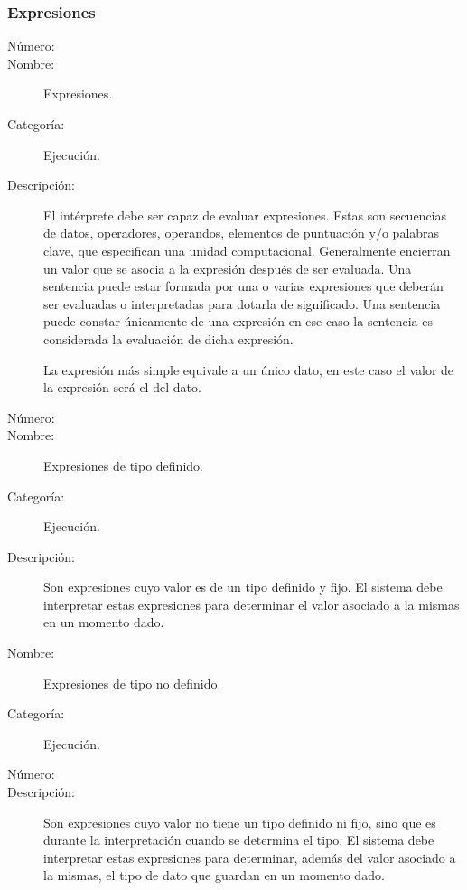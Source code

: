 \subsubsection{Expresiones}
\begin{framed}
	\begin{description}
		\item [Número:] \cn
		\item [Nombre:] Expresiones.
		\item [Categoría:] Ejecución.
		\item [Descripción:] El intérprete debe ser capaz de evaluar expresiones. Estas son secuencias de datos, operadores, operandos,
		elementos de puntuación y/o palabras clave, que especifican una unidad computacional.
		Generalmente encierran un valor que se asocia a la expresión después de ser evaluada. Una sentencia puede estar formada por una o
		varias expresiones que deberán ser evaluadas o interpretadas para dotarla de significado. Una sentencia puede constar únicamente
		de una expresión en ese caso la sentencia es considerada la evaluación de dicha expresión.
		
		La expresión más simple equivale a un único dato, en este caso el valor de la expresión será el del dato.
	\end {description}
\end{framed}

\begin{framed}
	\begin{description}
		\item [Número:] \cn
		\item [Nombre:] Expresiones de tipo definido.
		\item [Categoría:] Ejecución.
		\item [Descripción:] Son expresiones cuyo valor es de un tipo definido y fijo. El sistema debe interpretar estas expresiones para determinar el valor
		asociado a la mismas en un momento dado.
	\end {description}
\end{framed}

\begin{framed}
	\begin{description}
		\item [Nombre:] Expresiones de tipo no definido.
		\item [Categoría:] Ejecución.
		\item [Número:] \cn
		\item [Descripción:] Son expresiones cuyo valor no tiene un tipo definido ni fijo, sino que es durante la interpretación cuando se determina el tipo.
		El sistema debe interpretar estas expresiones para determinar, además del valor asociado a la mismas, el tipo de dato que guardan en un momento
		dado.
	\end {description}
\end{framed}


